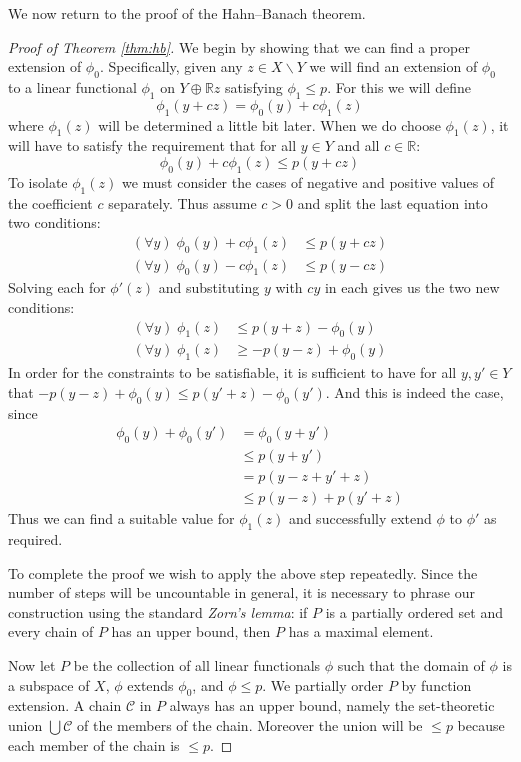 \documentclass[11pt,oneside]{amsbook}
\renewcommand{\setminus}{\smallsetminus}
\newcommand{\RR}{{\mathbb R}}
\theoremstyle{definition}
\theoremstyle{plain}
\theoremstyle{definition}
\theoremstyle{remark}
\numberwithin{equation}{section}
\numberwithin{figure}{section}
\begin{document}
We now return to the proof of the Hahn--Banach theorem.

\begin{proof}[Proof of Theorem \ref{thm:hb}]
  We begin by showing that we can find a proper extension of $\phi_0$. Specifically, given any $z\in X\setminus Y$ we will find an extension of $\phi_0$ to a linear functional $\phi_1$ on $Y\oplus\RR z$ satisfying $\phi_1\leq p$. For this we will define
  \[\phi_1(y+cz)=\phi_0(y)+c\phi_1(z)
  \]
  where $\phi_1(z)$ will be determined a little bit later. When we do choose $\phi_1(z)$, it will have to satisfy the requirement that for all $y\in Y$ and all $c\in\RR$:
  \[\phi_0(y)+c\phi_1(z)\leq p(y+cz)
  \]
  To isolate $\phi_1(z)$ we must consider the cases of negative and positive values of the coefficient $c$ separately. Thus assume $c>0$ and split the last equation into two conditions:
  \begin{align*}
    (\forall y)\;\phi_0(y)+c\phi_1(z)&\leq p(y+cz)\\
    (\forall y)\;\phi_0(y)-c\phi_1(z)&\leq p(y-cz)
  \end{align*}
  Solving each for $\phi'(z)$ and substituting $y$ with $cy$ in each gives us the two new conditions:
  \begin{align*}
    (\forall y)\;\phi_1(z)&\leq p(y+z)-\phi_0(y)\\
    (\forall y)\;\phi_1(z)&\geq-p(y-z)+\phi_0(y)
  \end{align*}
  In order for the constraints to be satisfiable, it is sufficient to have for all $y,y'\in Y$ that $-p(y-z)+\phi_0(y)\leq p(y'+z)-\phi_0(y')$. And this is indeed the case, since
  \begin{align*}
    \phi_0(y)+\phi_0(y')&=\phi_0(y+y')\\
                       &\leq p(y+y')\\
                       &=p(y-z+y'+z)\\
                       &\leq p(y-z)+p(y'+z)
  \end{align*}
  Thus we can find a suitable value for $\phi_1(z)$ and successfully extend $\phi$ to $\phi'$ as required.
  
  To complete the proof we wish to apply the above step repeatedly. Since the number of steps will be uncountable in general, it is necessary to phrase our construction using the standard \emph{Zorn's lemma}: if $P$ is a partially ordered set and every chain of $P$ has an upper bound, then $P$ has a maximal element.

  Now let $P$ be the collection of all linear functionals $\phi$ such that the domain of $\phi$ is a subspace of $X$, $\phi$ extends $\phi_0$, and $\phi\leq p$. We partially order $P$ by function extension. A chain $\mathcal C$ in $P$ always has an upper bound, namely the set-theoretic union $\bigcup\mathcal C$ of the members of the chain. Moreover the union will be $\leq p$ because each member of the chain is $\leq p$.


\end{proof}
\end{document}
